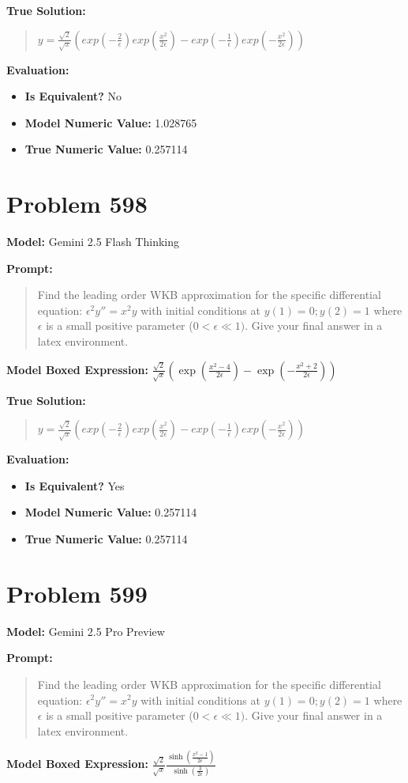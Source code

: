 \documentclass{article}
\begin{document}
\textbf{True Solution:}
\begin{quote}
$y=\frac{\sqrt{2}}{\sqrt{x}}(exp(-\frac{2}{\epsilon})exp(\frac{x^2}{2\epsilon})-exp(-\frac{1}{\epsilon})exp(-\frac{x^2}{2\epsilon}))$
\end{quote}

\textbf{Evaluation:}
\begin{itemize}
\item \textbf{Is Equivalent?} No
\item \textbf{Model Numeric Value:} 1.028765
\item \textbf{True Numeric Value:} 0.257114
\end{itemize}
\vspace{1cm}
\section*{Problem 598}
\textbf{Model:} Gemini 2.5 Flash Thinking

\textbf{Prompt:}
\begin{quote}
Find the leading order WKB approximation for the specific differential equation: $\epsilon^2y''=x^2y$ with initial conditions at $y(1)=0; y(2)=1$ where $\epsilon$ is a small positive parameter ($0 < \epsilon \ll 1)$. Give your final answer in a \boxed latex environment.
\end{quote}
\textbf{Model Boxed Expression:} $\frac{\sqrt{2}}{\sqrt{x}} \left( \exp\left(\frac{x^2-4}{2\epsilon}\right) - \exp\left(-\frac{x^2+2}{2\epsilon}\right) \right)$

\textbf{True Solution:}
\begin{quote}
$y=\frac{\sqrt{2}}{\sqrt{x}}(exp(-\frac{2}{\epsilon})exp(\frac{x^2}{2\epsilon})-exp(-\frac{1}{\epsilon})exp(-\frac{x^2}{2\epsilon}))$
\end{quote}

\textbf{Evaluation:}
\begin{itemize}
\item \textbf{Is Equivalent?} Yes
\item \textbf{Model Numeric Value:} 0.257114
\item \textbf{True Numeric Value:} 0.257114
\end{itemize}
\vspace{1cm}
\section*{Problem 599}
\textbf{Model:} Gemini 2.5 Pro Preview

\textbf{Prompt:}
\begin{quote}
Find the leading order WKB approximation for the specific differential equation: $\epsilon^2y''=x^2y$ with initial conditions at $y(1)=0; y(2)=1$ where $\epsilon$ is a small positive parameter ($0 < \epsilon \ll 1)$. Give your final answer in a \boxed latex environment.
\end{quote}
\textbf{Model Boxed Expression:} $\frac{\sqrt{2}}{\sqrt{x}} \frac{\sinh\left(\frac{x^2-1}{2\epsilon}\right)}{\sinh\left(\frac{3}{2\epsilon}\right)}$
\end{document}
